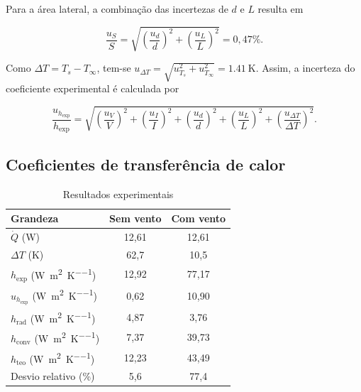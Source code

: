 \documentclass[11pt,a4paper]{article}
\newcommand{\qsem}{12{,}61}
\newcommand{\qcom}{12{,}61}
\newcommand{\DTsem}{62{,}7}
\newcommand{\DTcom}{10{,}5}
\newcommand{\hexpsem}{12{,}92}
\newcommand{\hexpcom}{77{,}17}
\newcommand{\uhexpsem}{0{,}62}
\newcommand{\uhexpcom}{10{,}90}
\newcommand{\hradsem}{4{,}87}
\newcommand{\hradcom}{3{,}76}
\newcommand{\hconvsem}{7{,}37}
\newcommand{\hconvcom}{39{,}73}
\newcommand{\hteosem}{12{,}23}
\newcommand{\hteocom}{43{,}49}
\newcommand{\desviosem}{5{,}6}
\newcommand{\desviocom}{77{,}4}
\begin{document}
Para a área lateral, a combinação das incertezas de $d$ e $L$ resulta em

\begin{equation}
  \frac{u_S}{S}=
  \sqrt{\left(\frac{u_d}{d}\right)^2+
        \left(\frac{u_L}{L}\right)^2}
  =0{,}47\%.
  \label{eq:uarea}
\end{equation}

Como $\Delta T=T_s-T_\infty$, tem-se $u_{\Delta T}=\sqrt{u_{T_s}^2+u_{T_\infty}^2}=\SI{1.41}{\kelvin}$. Assim, a incerteza do coeficiente experimental é calculada por

\begin{equation}
  \frac{u_{h_{\mathrm{exp}}}}{h_{\mathrm{exp}}}=
  \sqrt{
    \left(\frac{u_V}{V}\right)^2+
    \left(\frac{u_I}{I}\right)^2+
    \left(\frac{u_d}{d}\right)^2+
    \left(\frac{u_L}{L}\right)^2+
    \left(\frac{u_{\Delta T}}{\Delta T}\right)^2}.
  \label{eq:uh}
\end{equation}

\subsection{Coeficientes de transferência de calor}

\begin{table}[H]
  \centering
  \caption{Resultados experimentais}
  \label{tab:resultados}
  \small
  \begin{tabular}{lcc}
    \toprule
    \textbf{Grandeza} & \textbf{Sem vento} & \textbf{Com vento} \\
    \midrule
    $\dot Q$ (\si{\watt}) & \qsem & \qcom \\
    $\Delta T$ (\si{\kelvin}) & \DTsem & \DTcom \\
    $h_{\mathrm{exp}}$ (\si{\watt\per\square\metre\per\kelvin}) & \hexpsem & \hexpcom \\
    $u_{h_{\mathrm{exp}}}$ (\si{\watt\per\square\metre\per\kelvin}) & \uhexpsem & \uhexpcom \\
    $h_{\mathrm{rad}}$ (\si{\watt\per\square\metre\per\kelvin}) & \hradsem & \hradcom \\
    $h_{\mathrm{conv}}$ (\si{\watt\per\square\metre\per\kelvin}) & \hconvsem & \hconvcom \\
    $h_{\mathrm{teo}}$ (\si{\watt\per\square\metre\per\kelvin}) & \hteosem & \hteocom \\
    Desvio relativo (\si{\percent}) & \desviosem & \desviocom \\
    \bottomrule
  \end{tabular}
\end{table}
\end{document}
